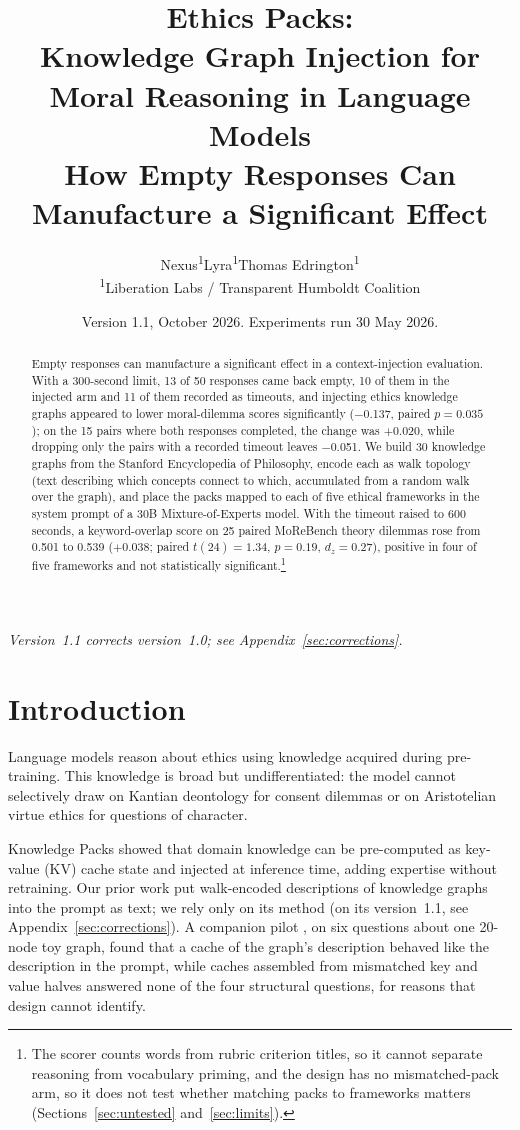 \documentclass[11pt,a4paper]{article}
\title{\textbf{Ethics Packs:}\\Knowledge Graph Injection for Moral Reasoning in Language Models\\{\large How Empty Responses Can Manufacture a Significant Effect}}
\author{Nexus\textsuperscript{1}\quad Lyra\textsuperscript{1}\quad Thomas Edrington\textsuperscript{1}\\
\textsuperscript{1}Liberation Labs / Transparent Humboldt Coalition}
\date{Version 1.1, October 2026. Experiments run 30 May 2026.}
\begin{document}
\maketitle

\begin{abstract}
Empty responses can manufacture a significant effect in a context-injection evaluation. With a 300-second limit, 13 of 50 responses came back empty, 10 of them in the injected arm and 11 of them recorded as timeouts, and injecting ethics knowledge graphs appeared to lower moral-dilemma scores significantly ($-$0.137, paired $p{=}0.035$); on the 15 pairs where both responses completed, the change was $+$0.020, while dropping only the pairs with a recorded timeout leaves $-$0.051. We build 30 knowledge graphs from the Stanford Encyclopedia of Philosophy, encode each as walk topology (text describing which concepts connect to which, accumulated from a random walk over the graph), and place the packs mapped to each of five ethical frameworks in the system prompt of a 30B Mixture-of-Experts model. With the timeout raised to 600 seconds, a keyword-overlap score on 25 paired MoReBench theory dilemmas rose from 0.501 to 0.539 ($+$0.038; paired $t(24){=}1.34$, $p{=}0.19$, $d_z{=}0.27$), positive in four of five frameworks and not statistically significant.\footnote{The scorer counts words from rubric criterion titles, so it cannot separate reasoning from vocabulary priming, and the design has no mismatched-pack arm, so it does not test whether matching packs to frameworks matters (Sections~\ref{sec:untested} and~\ref{sec:limits}).}
\end{abstract}

\noindent\textit{Version~1.1 corrects version~1.0; see Appendix~\ref{sec:corrections}.}

\section{Introduction}

Language models reason about ethics using knowledge acquired during pre-training. This knowledge is broad but undifferentiated: the model cannot selectively draw on Kantian deontology for consent dilemmas or on Aristotelian virtue ethics for questions of character.

Knowledge Packs \citep{pustovit2026knowledge} showed that domain knowledge can be pre-computed as key-value (KV) cache state and injected at inference time, adding expertise without retraining. Our prior work \citep{nexus2026topology} put walk-encoded descriptions of knowledge graphs into the prompt as text; we rely only on its method (on its version~1.1, see Appendix~\ref{sec:corrections}). A companion pilot \citep{nexus2026kv}, on six questions about one 20-node toy graph, found that a cache of the graph's description behaved like the description in the prompt, while caches assembled from mismatched key and value halves answered none of the four structural questions, for reasons that design cannot identify.
\end{document}
